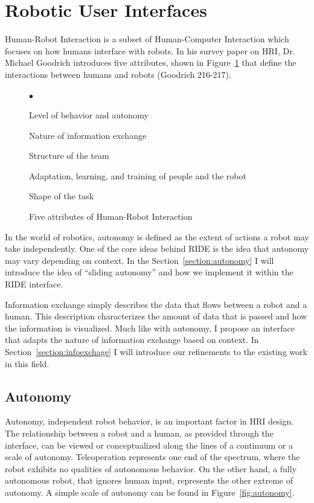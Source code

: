\section{Robotic User Interfaces}

Human-Robot Interaction is a subset of Human-Computer Interaction which focuses on how humans interface with robots. In his survey paper on HRI, Dr. Michael Goodrich introduces five attributes, shown in Figure~\ref{fig:five-attributes} that define the interactions between humans and robots (Goodrich 216-217).

\begin{figure}[ht]
	\makebox[\textwidth]{\hrulefill}
	\begin{list}{$\bullet$}
		\item Level of behavior and autonomy
		\item Nature of information exchange
		\item Structure of the team
		\item Adaptation, learning, and training of people and the robot
		\item Shape of the task
	\end{list}
	\makebox[\textwidth]{\hrulefill}
	\caption{Five attributes of Human-Robot Interaction \label{fig:five-attributes}}
\end{figure}

In the world of robotics, autonomy is defined as the extent of actions a robot may take independently. One of the core ideas behind RIDE is the idea that autonomy may vary depending on context. In the Section~\ref{section:autonomy} I will introduce the idea of ``sliding autonomy'' and how we implement it within the RIDE interface.

Information exchange simply describes the data that flows between a robot and a human. This description characterizes the amount of data that is passed and how the information is visualized. Much like with autonomy, I propose an interface that adapts the nature of information exchange based on context. In Section~\ref{section:infoexchage} I will introduce our refinements to the existing work in this field.


\subsection{Autonomy}

Autonomy, independent robot behavior, is an important factor in HRI design. The relationship between a robot and a human, as provided through the interface, can be viewed or conceptualized along the lines of a continuum or a scale of autonomy. Teleoperation represents one end of the spectrum, where the robot exhibits no qualities of autonomous behavior. On the other hand, a fully autonomous robot, that ignores human input, represents the other extreme of autonomy. A simple scale of autonomy can be found in Figure~\ref{fig:autonomy}. \cite{Goodrich_Survey}


